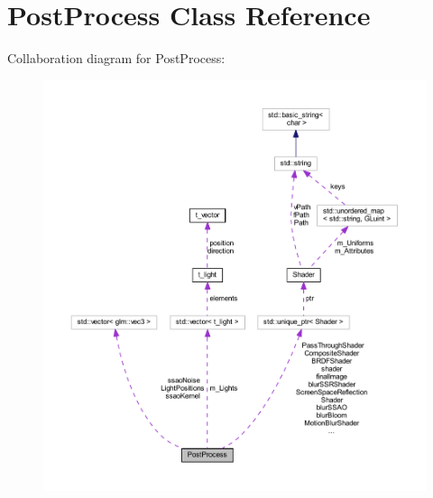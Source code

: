 \hypertarget{class_post_process}{}\section{Post\+Process Class Reference}
\label{class_post_process}


Collaboration diagram for Post\+Process\+:
\nopagebreak
\begin{figure}[H]
\begin{center}
\leavevmode
\includegraphics[width=350pt]{class_post_process__coll__graph}
\end{center}
\end{figure}

